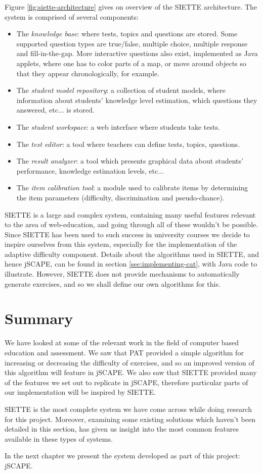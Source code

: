 Figure \ref{fig:siette-architecture} gives on overview of the SIETTE architecture. The system is comprised of several components\cite{SIETTE-components}:
\begin{itemize}
\item The \textit{knowledge base}: where tests, topics and questions are stored. Some supported question types are true/false, multiple choice, multiple response and fill-in-the-gap. More interactive questions also exist, implemented as Java applets, where one has to color parts of a map, or move around objects so that they appear chronologically, for example.
\item The \textit{student model repository}: a collection of student models, where information about students' knowledge level estimation, which questions they answered, etc... is stored.
\item The \textit{student workspace}: a web interface where students take tests.
\item The \textit{test editor}: a tool where teachers can define tests, topics, questions.
\item The \textit{result analyzer}: a tool which presents graphical data about students' performance, knowledge estimation levels, etc...
\item The \textit{item calibration tool}: a module used to calibrate items by determining the item parameters (difficulty, discrimination and pseudo-chance).
\end{itemize}

SIETTE is a large and complex system, containing many useful features relevant to the area of web-education, and going through all of these wouldn't be possible. Since SIETTE has been used to such success in university courses we decide to inspire ourselves from this system, especially for the implementation of the adaptive difficulty component. Details about the algorithms used in SIETTE, and hence jSCAPE, can be found in section \ref{sec:implementing-cat}, with Java code to illustrate. However, SIETTE does not provide mechanisms to automatically generate exercises, and so we shall define our own algorithms for this.

\section{Summary}
We have looked at some of the relevant work in the field of computer based education and assessment. We saw that PAT provided a simple algorithm for increasing or decreasing the difficulty of exercises, and so an improved version of this algorithm will feature in jSCAPE. We also saw that SIETTE provided many of the features we set out to replicate in jSCAPE, therefore particular parts of our implementation will be inspired by SIETTE.\newline

SIETTE is the most complete system we have come across while doing research for this project. Moreover, examining some existing solutions which haven't been detailed in this section, has given us insight into the most common features available in these types of systems. \newline

In the next chapter we present the system developed as part of this project: jSCAPE. 